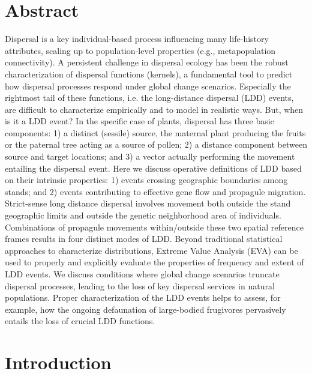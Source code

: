 \documentclass[a4paper, 12pt]{article}
\begin{document}
\section*{Abstract}
\begin{linenumbers}

Dispersal is a key individual-based process influencing many life-history attributes, scaling up to population-level properties (e.g., metapopulation connectivity). A persistent challenge in dispersal ecology has been the robust characterization of dispersal functions (kernels), a fundamental tool to predict how dispersal processes respond under global change scenarios. Especially the rightmost tail of these functions, i.e. the long-distance dispersal (LDD) events, are difficult to characterize empirically and to model in realistic ways. But, when is it a LDD event? In the specific case of plants, dispersal has three basic components: 1) a distinct (sessile) source, the maternal plant producing the fruits or the paternal tree acting as a source of pollen; 2) a distance component between source and target locations; and 3) a vector actually performing the movement entailing the dispersal event. Here we discuss operative definitions of LDD based on their intrinsic properties: 1) events crossing geographic boundaries among stands; and 2) events contributing to effective gene flow and propagule migration. Strict-sense long distance dispersal involves movement both outside the stand geographic limits and outside the genetic neighborhood area of individuals. Combinations of propagule movements within/outside these two spatial reference frames results in four distinct modes of LDD. Beyond traditional statistical approaches to characterize distributions, Extreme Value Analysis (EVA) can be used to properly and explicitly evaluate the properties of frequency and extent of LDD events. We discuss conditions where global change scenarios truncate dispersal processes, leading to the loss of key dispersal services in natural populations. Proper characterization of the LDD events helps to assess, for example, how the ongoing defaunation of large-bodied frugivores pervasively entails the loss of crucial LDD functions.

\newpage

\section*{Introduction}


\end{linenumbers}
\end{document}
